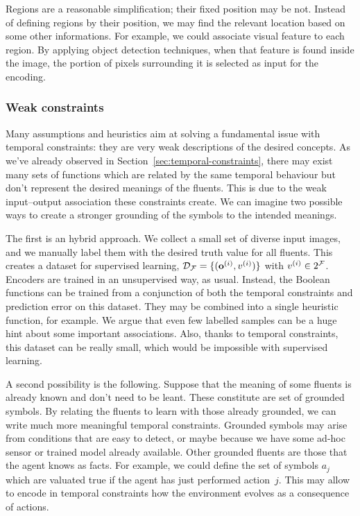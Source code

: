 Regions are a reasonable simplification; their fixed position may be not.
Instead of defining regions by their position, we may find the relevant
location based on some other informations.  For example, we could associate
visual feature to each region. By applying object detection techniques, when
that feature is found inside the image, the portion of pixels surrounding it
is selected as input for the encoding.

\subsubsection*{Weak constraints}

Many assumptions and heuristics aim at solving a fundamental issue with
temporal constraints: they are very weak descriptions of the desired concepts.
As we've already observed in Section~\ref{sec:temporal-constraints}, there may
exist many sets of functions which are related by the same temporal behaviour
but don't represent the desired meanings of the fluents. This is due to the
weak input--output association these constraints create. We can imagine two
possible ways to create a stronger grounding of the symbols to the intended
meanings.

The first is an hybrid approach. We collect a small set of diverse input
images, and we manually label them with the desired truth value for all
fluents. This creates a dataset for supervised learning, $\mathcal{D}_{\mathcal{F}} =
\{(\mathbf{o}^{(i)}, v^{(i)})\}$ with $v^{(i)} \in 2^{\mathcal{F}}$.
Encoders are trained in an unsupervised way, as usual. Instead, the
Boolean functions can be trained from a conjunction of both the temporal
constraints and prediction error on this dataset. They may be combined into a
single heuristic function, for example. We argue that even few labelled
samples can be a huge hint about some important associations. Also,
thanks to temporal constraints, this dataset can be really small, which
would be impossible with supervised learning.

A second possibility is the following. Suppose that the meaning of some
fluents is already known and don't need to be leant. These constitute are set
of grounded symbols. By relating the fluents to learn with those already
grounded, we can write much more meaningful temporal constraints. Grounded
symbols may arise from conditions that are easy to detect, or maybe because we
have some ad-hoc sensor or trained model already available. Other grounded
fluents are those that the agent knows as facts. For example, we could define
the set of symbols $a_j$ which are valuated true if the agent has just
performed action~$j$. This may allow to encode in temporal constraints how the
environment evolves as a consequence of actions.

